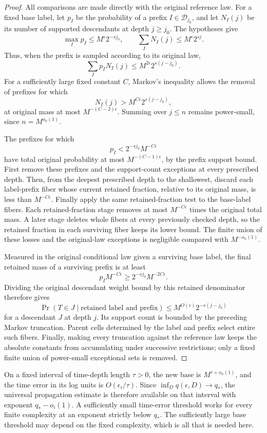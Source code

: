 \begin{proof}
All comparisons are made directly with the original reference law.
For a fixed base label, let \(p_I\) be the probability of a prefix
\(I\in\mathcal D_{j_0}\), and let \(N_I(j)\) be its number of
supported descendants at depth \(j\ge j_0\).  The hypotheses give
\[
\max_Ip_I\le M^\epsilon2^{-sj_0},
\qquad
\sum_I N_I(j)\le M^\epsilon2^{sj}.
\]
Thus, when the prefix is sampled according to its original law,
\[
\sum_I p_I N_I(j)
\le M^{2\epsilon}2^{s(j-j_0)}.
\]
For a sufficiently large fixed constant \(C\), Markov's inequality
allows the removal of prefixes for which
\[
N_I(j)>M^{C\epsilon}2^{s(j-j_0)},
\]
at original mass at most \(M^{-(C-2)\epsilon}\).
Summing over \(j\le n\) remains power-small, since \(n=M^{o_n(1)}\).

The prefixes for which
\[
p_I<2^{-sj_0}M^{-C\epsilon}
\]
have total original probability at most
\(M^{-(C-1)\epsilon}\), by the prefix support bound.  First remove
these prefixes and the support-count exceptions at every prescribed
depth.  Then, from the deepest prescribed depth to the shallowest,
discard each label-prefix fiber whose current retained fraction,
relative to its original mass, is less than \(M^{-C\epsilon}\).
Finally apply the same retained-fraction test to the base-label
fibers.  Each retained-fraction stage removes at most
\(M^{-C\epsilon}\) times the original total mass.  A later stage
deletes whole fibers at every
previously checked depth, so the retained fraction in each surviving
fiber keeps its lower bound.  The finite union of these losses and
the original-law exceptions is negligible compared with
\(M^{-o_n(1)}\).

Measured in the original conditional law given a surviving base
label, the final retained mass of a surviving prefix is at least
\[
p_I M^{-C\epsilon}\ge 2^{-sj_0}M^{-2C\epsilon}.
\]
Dividing the original descendant weight bound by this retained
denominator therefore gives
\[
\Pr(T\in J\mid\text{retained label and prefix})
\le M^{O(\epsilon)}2^{-s(j-j_0)}
\]
for a descendant \(J\) at depth \(j\).  Its support count is bounded
by the preceding Markov truncation.  Parent cells determined by
the label and prefix select entire such fibers.  Finally, making
every truncation against the reference law keeps the absolute
constants from accumulating under successive restrictions; only
a fixed finite union of power-small exceptional sets is removed.
\end{proof}

On a fixed interval of time-depth length \(\tau>0\), the new base is
\(M^{\tau+o_n(1)}\), and the time error in its log units is
\(O(\epsilon_i/\tau)\).  Since
\(\inf_D q(\epsilon,D)\to q_*\), the universal propagation estimate
is therefore available on that interval with exponent
\(q_*-o_i(1)\).  A sufficiently small time-error threshold works
for every finite complexity at an exponent strictly below \(q_*\).
The sufficiently large base threshold may depend on the fixed
complexity, which is all that is needed here.

